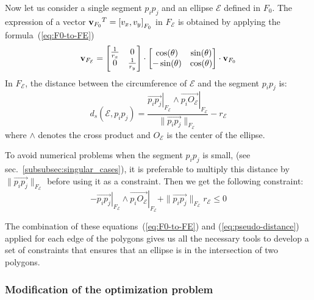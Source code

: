 Now let us consider a single segment $p_i p_j$ and an ellipse $\mathcal{E}$ defined in $F_0$.
The expression of a vector ${{\bf v}_{F_0}}^T = {[v_x, v_y]}_{F_0}$ in $F_\mathcal{E}$ is obtained by applying the formula~(\ref{eq:F0-to-FE})
\begin{equation}
{\bf v}_{F_\mathcal{E}} =
\begin{bmatrix}
\frac{1}{r_x} & 0 \\
0 & \frac{1}{r_y}
\end{bmatrix}
\cdot \begin{bmatrix}
\cos(\theta) & \sin(\theta) \\
-\sin(\theta) & \cos(\theta)
\end{bmatrix}
\cdot {\bf v}_{F_0}
\label{eq:F0-to-FE}
\end{equation}
In $F_\mathcal{E}$, the distance between the circumference of $\mathcal{E}$ and the segment $p_i p_j$ is:
\begin{equation}
  d_s(\mathcal{E}, p_i p_j) = \frac{{\left.\overrightarrow{p_i p_j}\right|}_{F_\mathcal{E}} \wedge {\left.\overrightarrow{p_i O_\mathcal{E}}\right|}_{F_\mathcal{E} } }{\| \overrightarrow{p_i p_j}\|_{F_\mathcal{E} } }-r_{\mathcal{E}}
\end{equation}
where $\wedge$ denotes the cross product and $O_{\mathcal{E}}$ is the center of the ellipse.

To avoid numerical problems when the segment $p_i p_j$ is small, (see sec.~\ref{subsubsec:singular_cases}), it is preferable to multiply this distance by $\| \overrightarrow{p_i p_j}\|_{F_\mathcal{E}}$ before using it as a constraint.
Then we get the following constraint:
\begin{equation}
  -{\left.\overrightarrow{p_i p_j}\right|}_{F_\mathcal{E}} \wedge {\left.\overrightarrow{p_i O_\mathcal{E}}\right|}_{F_\mathcal{E}}+\| \overrightarrow{p_i p_j}\|_{F_\mathcal{E}} r_{\mathcal{E}} \leq 0
\label{eq:pseudo-distance}
\end{equation}

The combination of these equations~(\ref{eq:F0-to-FE}) and (\ref{eq:pseudo-distance}) applied for each edge of the polygons gives us all the necessary tools to develop a set of constraints that ensures that an ellipse is in the intersection of two polygons.



\subsubsection{Modification of the optimization problem}

